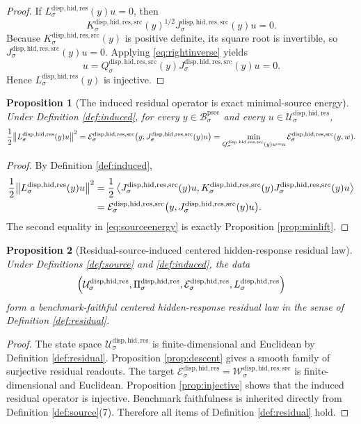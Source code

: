\documentclass[11pt]{article}
\newcommand{\ProtoSectionBody}[1]{\mathcal B_{#1}^{\mathrm{psec}}}
\newcommand{\ResidualState}[1]{\mathcal U_{#1}^{\mathrm{disp,hid,res}}}
\newcommand{\ResidualTarget}[1]{\mathcal E_{#1}^{\mathrm{disp,hid,res}}}
\newcommand{\ResidualReadout}[1]{\Pi_{#1}^{\mathrm{disp,hid,res}}}
\newcommand{\ResidualOperator}[1]{L_{#1}^{\mathrm{disp,hid,res}}}
\newcommand{\ResidualSourceCarrier}[1]{\mathcal W_{#1}^{\mathrm{disp,hid,res,src}}}
\newcommand{\ResidualSourceProjection}[1]{Q_{#1}^{\mathrm{disp,hid,res,src}}}
\newcommand{\ResidualSourceOperator}[1]{K_{#1}^{\mathrm{disp,hid,res,src}}}
\newcommand{\ResidualSourceLift}[1]{J_{#1}^{\mathrm{disp,hid,res,src}}}
\newcommand{\ResidualSourceEnergy}[1]{\mathcal E_{#1}^{\mathrm{disp,hid,res,src}}}
\newtheorem{proposition}{Proposition}
\begin{document}
\begin{proof}
If \(\ResidualOperator{\sigma}(y)u=0\), then
\[
\ResidualSourceOperator{\sigma}(y)^{1/2}
\ResidualSourceLift{\sigma}(y)u
=
0.
\]
Because \(\ResidualSourceOperator{\sigma}(y)\) is positive definite, its square root is invertible, so \(\ResidualSourceLift{\sigma}(y)u=0\). Applying \eqref{eq:rightinverse} yields
\[
u
=
\ResidualSourceProjection{\sigma}(y)\ResidualSourceLift{\sigma}(y)u
=
0.
\]
Hence \(\ResidualOperator{\sigma}(y)\) is injective.
\end{proof}

\begin{proposition}[The induced residual operator is exact minimal-source energy]
\label{prop:energy}
Under Definition \ref{def:induced}, for every \(y\in\ProtoSectionBody{\sigma}\) and every \(u\in\ResidualState{\sigma}\),
\begin{equation}
\frac{1}{2}
\norm{\ResidualOperator{\sigma}(y)u}^{2}
=
\ResidualSourceEnergy{\sigma}\bigl(y,\ResidualSourceLift{\sigma}(y)u\bigr)
=
\min_{\ResidualSourceProjection{\sigma}(y)w=u}
\ResidualSourceEnergy{\sigma}(y,w).
\label{eq:sourceenergy}
\end{equation}
\end{proposition}

\begin{proof}
By Definition \ref{def:induced},
\[
\begin{aligned}
\frac{1}{2}
\norm{\ResidualOperator{\sigma}(y)u}^{2}
&=
\frac{1}{2}
\ev{
\ResidualSourceLift{\sigma}(y)u,
\ResidualSourceOperator{\sigma}(y)\ResidualSourceLift{\sigma}(y)u
}\\
&=
\ResidualSourceEnergy{\sigma}\bigl(y,\ResidualSourceLift{\sigma}(y)u\bigr).
\end{aligned}
\]
The second equality in \eqref{eq:sourceenergy} is exactly Proposition \ref{prop:minlift}.
\end{proof}

\begin{proposition}[Residual-source-induced centered hidden-response residual law]
\label{prop:residual}
Under Definitions \ref{def:source} and \ref{def:induced}, the data
\[
\Bigl(
\ResidualState{\sigma},
\ResidualReadout{\sigma},
\ResidualTarget{\sigma},
\ResidualOperator{\sigma}
\Bigr)
\]
form a benchmark-faithful centered hidden-response residual law in the sense of Definition \ref{def:residual}.
\end{proposition}

\begin{proof}
The state space \(\ResidualState{\sigma}\) is finite-dimensional and Euclidean by Definition \ref{def:residual}. Proposition \ref{prop:descent} gives a smooth family of surjective residual readouts. The target \(\ResidualTarget{\sigma}=\ResidualSourceCarrier{\sigma}\) is finite-dimensional and Euclidean. Proposition \ref{prop:injective} shows that the induced residual operator is injective. Benchmark faithfulness is inherited directly from Definition \ref{def:source}(7). Therefore all items of Definition \ref{def:residual} hold.
\end{proof}
\end{document}
